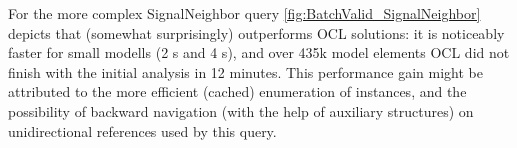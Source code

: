 % 
% 

For the more complex \textsf{SignalNeighbor} query
\autoref{fig:BatchValid_SignalNeighbor} depicts that \eiq{} (somewhat
surprisingly) outperforms OCL solutions: it is noticeably faster for small
modells (2 s and 4 s), and over 435k model elements OCL did not finish with
the initial analysis in 12 minutes. This performance gain might be attributed to
the more efficient (cached) enumeration of instances, and the possibility of
backward navigation (with the help of auxiliary structures) on unidirectional
references used by this query.

